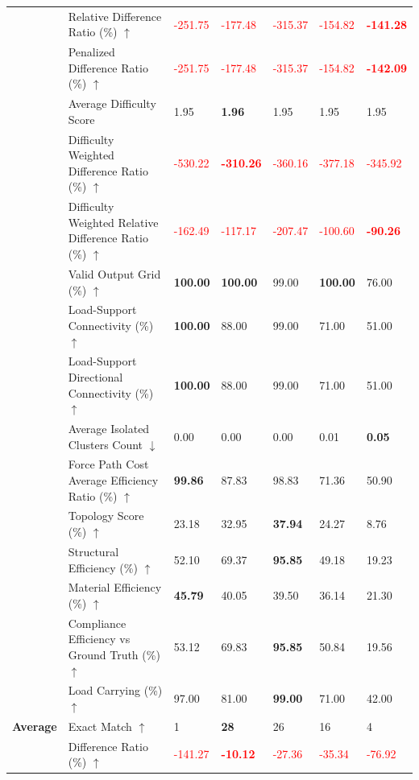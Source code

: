 \begin{table}[!h]
{\begin{tabular}{lllllll}
 & Relative Difference Ratio (\%) $\uparrow$ & \textcolor{red}{-251.75} & \textcolor{red}{-177.48} & \textcolor{red}{-315.37} & \textcolor{red}{-154.82} & \textbf{\textcolor{red}{-141.28}} \\
 & Penalized Difference Ratio (\%) $\uparrow$ & \textcolor{red}{-251.75} & \textcolor{red}{-177.48} & \textcolor{red}{-315.37} & \textcolor{red}{-154.82} & \textbf{\textcolor{red}{-142.09}} \\
 & Average Difficulty Score & 1.95 & \textbf{1.96} & 1.95 & 1.95 & 1.95 \\
 & Difficulty Weighted Difference Ratio (\%) $\uparrow$ & \textcolor{red}{-530.22} & \textbf{\textcolor{red}{-310.26}} & \textcolor{red}{-360.16} & \textcolor{red}{-377.18} & \textcolor{red}{-345.92} \\
 & Difficulty Weighted Relative Difference Ratio (\%) $\uparrow$ & \textcolor{red}{-162.49} & \textcolor{red}{-117.17} & \textcolor{red}{-207.47} & \textcolor{red}{-100.60} & \textbf{\textcolor{red}{-90.26}} \\
 & Valid Output Grid (\%) $\uparrow$ & \textbf{100.00} & \textbf{100.00} & 99.00 & \textbf{100.00} & 76.00 \\
 & Load-Support Connectivity (\%) $\uparrow$ & \textbf{100.00} & 88.00 & 99.00 & 71.00 & 51.00 \\
 & Load-Support Directional Connectivity (\%) $\uparrow$ & \textbf{100.00} & 88.00 & 99.00 & 71.00 & 51.00 \\
 & Average Isolated Clusters Count $\downarrow$ & 0.00 & 0.00 & 0.00 & 0.01 & \textbf{0.05} \\
 & Force Path Cost Average Efficiency Ratio (\%) $\uparrow$ & \textbf{99.86} & 87.83 & 98.83 & 71.36 & 50.90 \\
 & Topology Score (\%) $\uparrow$ & 23.18 & 32.95 & \textbf{37.94} & 24.27 & 8.76 \\
 & Structural Efficiency (\%) $\uparrow$ & 52.10 & 69.37 & \textbf{95.85} & 49.18 & 19.23 \\
 & Material Efficiency (\%) $\uparrow$ & \textbf{45.79} & 40.05 & 39.50 & 36.14 & 21.30 \\
 & Compliance Efficiency vs Ground Truth (\%) $\uparrow$ & 53.12 & 69.83 & \textbf{95.85} & 50.84 & 19.56 \\
 & Load Carrying (\%) $\uparrow$ & 97.00 & 81.00 & \textbf{99.00} & 71.00 & 42.00 \\
\midrule
\textbf{Average} & Exact Match $\uparrow$ & 1 & \textbf{28} & 26 & 16 & 4 \\
 & Difference Ratio (\%) $\uparrow$ & \textcolor{red}{-141.27} & \textbf{\textcolor{red}{-10.12}} & \textcolor{red}{-27.36} & \textcolor{red}{-35.34} & \textcolor{red}{-76.92} \\

\end{tabular}}
\end{table}
